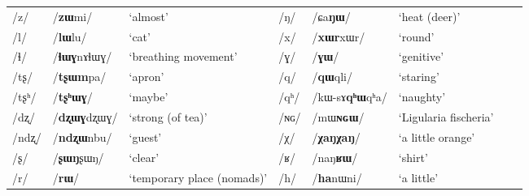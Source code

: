\documentclass[oneside,a4paper,11pt]{article}
\newcommand{\ipa}[1]{\mbox{\phon/#1/}}
\begin{document}
\begin{table}
{\begin{tabular}{llllllll}
 \ipa{z} & 	  \ipa{\textbf{zɯ}mi}   & 	 `almost' & \ipa{ŋ} & 	\ipa{ɕa\textbf{ŋɯ}}   & 	 `heat (deer)' \\ 
 \ipa{l} & 	  \ipa{\textbf{lɯ}lu}   & 	 `cat' & \ipa{x} & 	\ipa{\textbf{xɯr}xɯr}   & 	 `round' \\ 
 \ipa{ɬ} & 	  \ipa{\textbf{ɬɯɣ}nɤɬɯɣ}   & 	 `breathing movement' & \ipa{ɣ} & 	\ipa{\textbf{ɣɯ}}   & 	 `genitive' \\ 
 \ipa{tʂ} & 	 \ipa{\textbf{tʂɯm}pa}   & 	 `apron' & \ipa{q} & 	\ipa{\textbf{qɯ}qli}   & 	 `staring' \\ 
 \ipa{tʂʰ} & 	  \ipa{\textbf{tʂʰɯɣ}}   & 	 `maybe' & \ipa{qʰ} & 	\ipa{kɯ-sɤ\textbf{qʰɯ}qʰa}   & 	 `naughty' \\ 
 \ipa{dʐ} & 	\ipa{\textbf{dʐɯɣ}dʐɯɣ}   & 	 `strong (of tea)' & \ipa{ɴɢ} & 	\ipa{mɯ\textbf{ɴɢɯ}}  & 	 `Ligularia fischeria' \\ 
 \ipa{ndʐ} & 	\ipa{\textbf{ndʐɯ}nbu}   & 	 `guest' & \ipa{χ} & 	\ipa{\textbf{χaŋχaŋ}}   & 	 `a little orange' \\ 
 \ipa{ʂ} & 	\ipa{\textbf{ʂɯŋ}ʂɯŋ}   & 	 `clear' & \ipa{ʁ} & 	\ipa{naŋ\textbf{ʁɯ}}   & 	 `shirt' \\ 
 \ipa{r} & 	\ipa{\textbf{rɯ}}   & 	 `temporary place (nomads)' & 	  \ipa{h}&\ipa{\textbf{ha}nɯni} 	 & `a little'	 \\ 
\end{tabular}}
\end{table}
\end{document}
